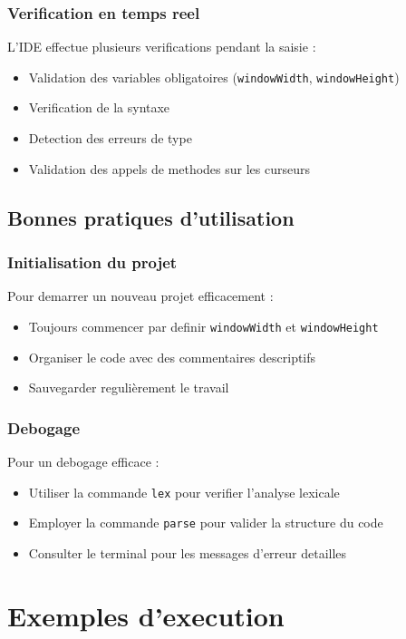 \documentclass[12pt,a4paper]{report}
\begin{document}
\subsection{Verification en temps reel}
L'IDE effectue plusieurs verifications pendant la saisie :
\begin{itemize}
    \item Validation des variables obligatoires (\texttt{windowWidth}, \texttt{windowHeight})
    \item Verification de la syntaxe
    \item Detection des erreurs de type
    \item Validation des appels de methodes sur les curseurs
\end{itemize}

\section{Bonnes pratiques d'utilisation}

\subsection{Initialisation du projet}
Pour demarrer un nouveau projet efficacement :
\begin{itemize}
    \item Toujours commencer par definir \texttt{windowWidth} et \texttt{windowHeight}
    \item Organiser le code avec des commentaires descriptifs
    \item Sauvegarder regulièrement le travail
\end{itemize}

\subsection{Debogage}
Pour un debogage efficace :
\begin{itemize}
    \item Utiliser la commande \texttt{lex} pour verifier l'analyse lexicale
    \item Employer la commande \texttt{parse} pour valider la structure du code
    \item Consulter le terminal pour les messages d'erreur detailles
\end{itemize}


\chapter{Exemples d'execution}
\end{document}
